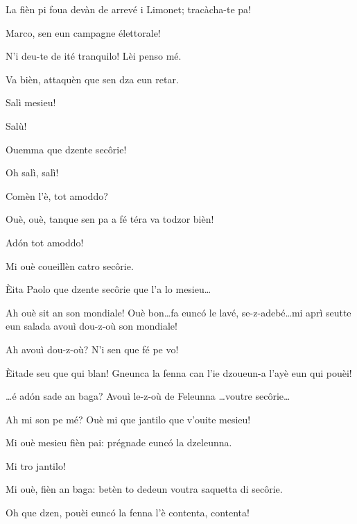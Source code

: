 \begin{drama}
\Marcospeaks La fièn pi foua devàn de arrevé i Limonet; tracàcha-te pa!

\Cimaspeaks Marco, sen eun campagne élettorale!

\Marcospeaks N'i deu-te de ité tranquilo! Lèi penso mé.

\Cimaspeaks  Va bièn, attaquèn que sen dza eun retar.


\Marcospeaks Salì mesieu!

\Pompiolenspeaks Salù!

\Marcospeaks Ouemma que dzente sec\^orie!

\Pompiolenspeaks Oh salì, salì!

\Cimaspeaks Comèn l'è, tot amoddo?

\Pompiolenspeaks Ouè, ouè, tanque sen pa a fé téra va todzor bièn!

\Cimaspeaks Ad\'on tot amoddo!

\Pompiolenspeaks Mi ouè coueillèn catro sec\^orie.

\Marcospeaks Èita Paolo que dzente sec\^orie que l'a lo mesieu\ldots

\Pompiolenspeaks Ah ouè sit an son mondiale! Ouè bon\ldots fa eunc\'o le lavé, se-z-adebé\ldots mi aprì seutte eun salada avouì dou-z-où \ou son mondiale!

\Marcospeaks Ah avouì dou-z-où? N'i sen que fé pe vo!


\Pompiolenspeaks {} Èitade seu que qui blan! Gneunca la fenna can l'ie dzoueun-a l'ayè eun qui pouèi!

\Cimaspeaks \ldots é ad\'on sade an baga? Avouì le-z-où de Feleunna \ldots  voutre sec\^orie\ldots 

\Pompiolenspeaks Ah mi son pe mé? Ouè mi que jantilo que v'ouite mesieu!

\Marcospeaks {} Mi ouè mesieu fièn pai: prégnade eunc\'o la dzeleunna.

\Pompiolenspeaks Mi tro jantilo! 

\Cimaspeaks Mi ouè, fièn an baga: betèn to dedeun  voutra saquetta di sec\^orie.


\Pompiolenspeaks Oh que dzen, pouèi eunc\'o la fenna l'è contenta, contenta!


\end{drama}
